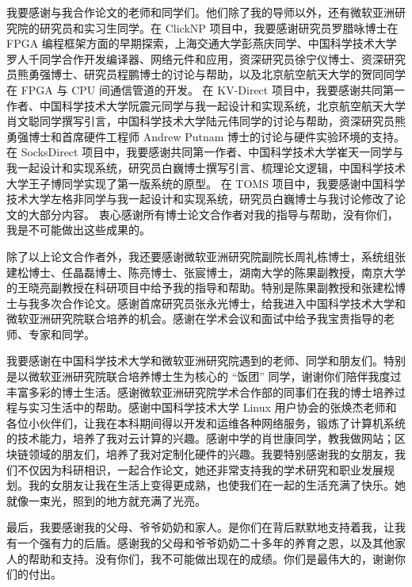 \begin{acknowledgements}
我要感谢与我合作论文的老师和同学们。他们除了我的导师以外，还有微软亚洲研究院的研究员和实习生同学。在 ClickNP 项目中，我要感谢研究员罗腊咏博士在 FPGA 编程框架方面的早期探索，上海交通大学彭燕庆同学、中国科学技术大学罗人千同学合作开发编译器、网络元件和应用，资深研究员徐宁仪博士、资深研究员熊勇强博士、研究员程鹏博士的讨论与帮助，以及北京航空航天大学的贺同同学在 FPGA 与 CPU 间通信管道的开发。
在 KV-Direct 项目中，我要感谢共同第一作者、中国科学技术大学阮震元同学与我一起设计和实现系统，北京航空航天大学肖文聪同学撰写引言，中国科学技术大学陆元伟同学的讨论与帮助，资深研究员熊勇强博士和首席硬件工程师 Andrew Putnam 博士的讨论与硬件实验环境的支持。
在 SocksDirect 项目中，我要感谢共同第一作者、中国科学技术大学崔天一同学与我一起设计和实现系统，研究员白巍博士撰写引言、梳理论文逻辑，中国科学技术大学王子博同学实现了第一版系统的原型。
在 TOMS 项目中，我要感谢中国科学技术大学左格非同学与我一起设计和实现系统，研究员白巍博士与我讨论修改了论文的大部分内容。
衷心感谢所有博士论文合作者对我的指导与帮助，没有你们，我是不可能做出这些成果的。

除了以上论文合作者外，我还要感谢微软亚洲研究院副院长周礼栋博士，系统组张建松博士、任晶磊博士、陈亮博士、张宸博士，湖南⼤学的陈果副教授，南京⼤学的王晓亮副教授在科研项⽬中给予我的指导和帮助。特别是陈果副教授和张建松博士与我多次合作论文。感谢首席研究员张永光博士，给我进入中国科学技术⼤学和微软亚洲研究院联合培养的机会。感谢在学术会议和面试中给予我宝贵指导的老师、专家和同学。

我要感谢在中国科学技术⼤学和微软亚洲研究院遇到的⽼师、同学和朋友们。特别是以微软亚洲研究院联合培养博士生为核心的 ``饭团'' 同学，谢谢你们陪伴我度过丰富多彩的博士生活。感谢微软亚洲研究院学术合作部的同事们在我的博士培养过程与实习生活中的帮助。感谢中国科学技术大学 Linux 用户协会的张焕杰老师和各位小伙伴们，让我在本科期间得以开发和运维各种网络服务，锻炼了计算机系统的技术能力，培养了我对云计算的兴趣。感谢中学的肖世康同学，教我做网站；区块链领域的朋友们，培养了我对定制化硬件的兴趣。我要特别感谢我的女朋友，我们不仅因为科研相识，一起合作论文，她还非常支持我的学术研究和职业发展规划。我的女朋友让我在生活上变得更成熟，也使我们在一起的生活充满了快乐。她就像一束光，照到的地方就充满了光亮。

最后，我要感谢我的⽗母、爷爷奶奶和家⼈。是你们在背后默默地⽀持着我，让我有⼀个强有⼒的后盾。感谢我的⽗母和爷爷奶奶⼆⼗多年的养育之恩，以及其他家⼈的帮助和⽀持。没有你们，我不可能做出现在的成绩。你们是最伟⼤的，谢谢你们的付出。
\end{acknowledgements}
